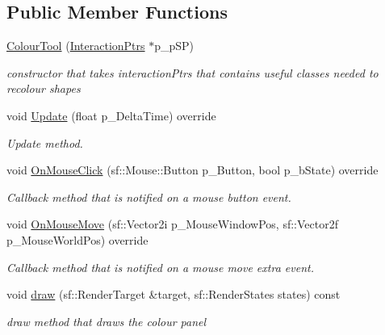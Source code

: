 \subsection*{Public Member Functions}
\begin{DoxyCompactItemize}
\item 
\mbox{\label{class_colour_tool_aaedac79d91816998884ea165f1b58da0}} 
\hyperlink{class_colour_tool_aaedac79d91816998884ea165f1b58da0}{Colour\+Tool} (\hyperlink{struct_interaction_ptrs}{Interaction\+Ptrs} $\ast$p\+\_\+p\+SP)
\begin{DoxyCompactList}\small\item\em constructor that takes interaction\+Ptrs that contains useful classes needed to recolour shapes \end{DoxyCompactList}\item 
\mbox{\label{class_colour_tool_a8f6f08e54a1e074740aee812bbe54db0}} 
void \hyperlink{class_colour_tool_a8f6f08e54a1e074740aee812bbe54db0}{Update} (float p\+\_\+\+Delta\+Time) override
\begin{DoxyCompactList}\small\item\em Update method. \end{DoxyCompactList}\item 
\mbox{\label{class_colour_tool_a2a499beddabdf11b1d982c68174df8ad}} 
void \hyperlink{class_colour_tool_a2a499beddabdf11b1d982c68174df8ad}{On\+Mouse\+Click} (sf\+::\+Mouse\+::\+Button p\+\_\+\+Button, bool p\+\_\+b\+State) override
\begin{DoxyCompactList}\small\item\em Callback method that is notified on a mouse button event. \end{DoxyCompactList}\item 
\mbox{\label{class_colour_tool_a02ad228f089cf99ba9f56b66f18de24b}} 
void \hyperlink{class_colour_tool_a02ad228f089cf99ba9f56b66f18de24b}{On\+Mouse\+Move} (sf\+::\+Vector2i p\+\_\+\+Mouse\+Window\+Pos, sf\+::\+Vector2f p\+\_\+\+Mouse\+World\+Pos) override
\begin{DoxyCompactList}\small\item\em Callback method that is notified on a mouse move extra event. \end{DoxyCompactList}\item 
\mbox{\label{class_colour_tool_a60f7a883b45ab06a0461988fa48e38d5}} 
void \hyperlink{class_colour_tool_a60f7a883b45ab06a0461988fa48e38d5}{draw} (sf\+::\+Render\+Target \&target, sf\+::\+Render\+States states) const
\begin{DoxyCompactList}\small\item\em draw method that draws the colour panel \end{DoxyCompactList}\end{DoxyCompactItemize}
